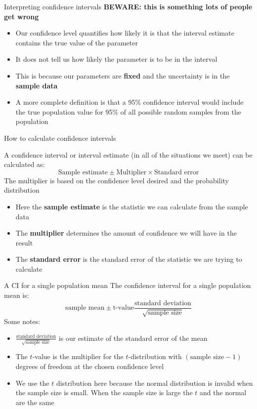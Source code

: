 \documentclass[12pt,xcolor=dvipsnames,handout,mathserif,aspectratio=169]{beamer}
\newcommand{\bbl}[1]{{\color{NavyBlue} \textbf{#1}}}
\newcommand{\bre}[1]{{\color{red} \textbf{#1}}}
\newcommand{\bgr}[1]{{\color{PineGreen} \textbf{#1}}}
\begin{document}
\begin{frame}{Interpreting confidence intervals}
\bre{BEWARE: this is something lots of people get wrong}
\begin{itemize}
\item Our confidence level quantifies how likely it is that the interval estimate contains the true value of the parameter
\item It does not tell us how likely the parameter is to be in the interval
\item This is because our parameters are \bre{fixed} and the uncertainty is in the \bgr{sample data}
\item A more complete definition is that a 95\% confidence interval would include the true population value for 95\% of all possible random samples from the population
\end{itemize}

\end{frame}

\begin{frame}{How to calculate confidence intervals}

\begin{block}{}
A confidence interval or interval estimate (in all of the situations we meet) can be calculated as:
$$\mbox{Sample estimate} \pm \mbox{Multiplier} \times \mbox{Standard error}$$
The multiplier is based on the confidence level desired and the probability distribution 
\end{block}
\pause
\begin{itemize}
\item Here the \bbl{sample estimate} is the statistic we can calculate from the sample data
\item The \bgr{multiplier} determines the amount of confidence we will have in the result
\item The \bre{standard error} is the standard error of the statistic we are trying to calculate
\end{itemize}
\end{frame}

\begin{frame}{A CI for a single population mean}
The confidence interval for a single population mean is:
$$\mbox{sample mean} \pm \mbox{t-value} \frac{\mbox{standard deviation}}{\sqrt{\mbox{sample size}}}$$
Some notes:
\begin{itemize}
\item $\frac{\mbox{standard deviation}}{\sqrt{\mbox{sample size}}}$ is our estimate of the standard error of the mean
\item The $t$-value is the multiplier for the $t$-distribution with $(\mbox{sample size}-1)$ degrees of freedom at the chosen confidence level
\item We use the $t$ distribution here because the normal distribution is invalid when the sample size is small. When the sample size is large the $t$ and the normal are the same
\end{itemize}
\end{frame}
\end{document}
